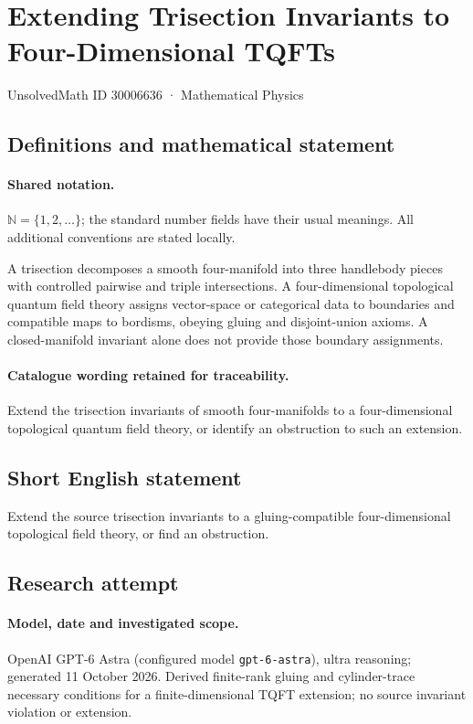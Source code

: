 \documentclass[11pt]{article}
\begin{document}
\setcounter{section}{30006635}
\section{Extending Trisection Invariants to Four-Dimensional TQFTs}\label{30006636}
{\small UnsolvedMath ID 30006636 · Mathematical Physics}
\subsection{Definitions and mathematical statement}

\paragraph{Shared notation.}$\mathbb N=\{1,2,\ldots\}$; the standard number fields have their usual meanings. All additional conventions are stated locally.


A trisection decomposes a smooth four-manifold into three handlebody pieces with controlled pairwise and triple intersections. A four-dimensional topological quantum field theory assigns vector-space or categorical data to boundaries and compatible maps to bordisms, obeying gluing and disjoint-union axioms. A closed-manifold invariant alone does not provide those boundary assignments.

\paragraph{Catalogue wording retained for traceability.}
Extend the trisection invariants of smooth four-manifolds to a four-dimensional topological quantum field theory, or identify an obstruction to such an extension.
\subsection{Short English statement}
Extend the source trisection invariants to a gluing-compatible four-dimensional topological field theory, or find an obstruction.
\subsection{Research attempt}
\paragraph{Model, date and investigated scope.}
OpenAI GPT-6 Astra (configured model \texttt{gpt-6-astra}), ultra reasoning; generated 11 October 2026. Derived finite-rank gluing and cylinder-trace necessary conditions for a finite-dimensional TQFT extension; no source invariant violation or extension.
\end{document}
